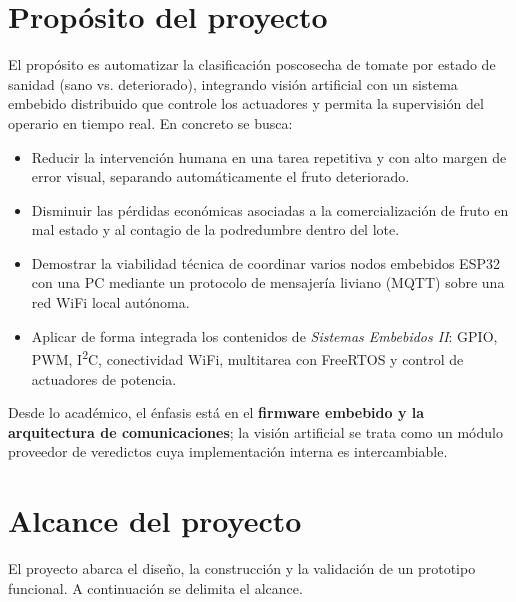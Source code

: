 \documentclass[12pt]{catolica_proyectos}
\begin{document}
\section{Propósito del proyecto}

El propósito es automatizar la clasificación poscosecha de tomate por estado de sanidad (sano vs. deteriorado), integrando visión artificial con un sistema embebido distribuido que controle los actuadores y permita la supervisión del operario en tiempo real. En concreto se busca:

\begin{itemize}
  \item Reducir la intervención humana en una tarea repetitiva y con alto margen de error visual, separando automáticamente el fruto deteriorado.
  \item Disminuir las pérdidas económicas asociadas a la comercialización de fruto en mal estado y al contagio de la podredumbre dentro del lote.
  \item Demostrar la viabilidad técnica de coordinar varios nodos embebidos ESP32 con una PC mediante un protocolo de mensajería liviano (MQTT) sobre una red WiFi local autónoma.
  \item Aplicar de forma integrada los contenidos de \emph{Sistemas Embebidos II}: GPIO, PWM, I\textsuperscript{2}C, conectividad WiFi, multitarea con FreeRTOS \cite{barry2016freertos} y control de actuadores de potencia.
\end{itemize}

Desde lo académico, el énfasis está en el \textbf{firmware embebido y la arquitectura de comunicaciones}; la visión artificial se trata como un módulo proveedor de veredictos cuya implementación interna es intercambiable.

\section{Alcance del proyecto}

El proyecto abarca el diseño, la construcción y la validación de un prototipo funcional. A continuación se delimita el alcance.
\end{document}
